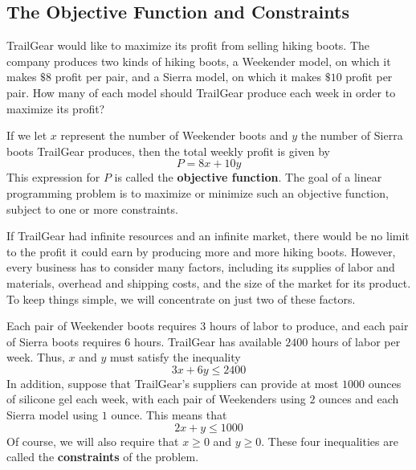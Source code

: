 \documentclass[10pt,]{book}
\newcommand{\terminology}[1]{\textbf{#1}}
\theoremstyle{plain}
\theoremstyle{definition}
\theoremstyle{definition}
\theoremstyle{definition}
\numberwithin{equation}{part}
\begin{document}
\subsection[{The Objective Function and Constraints}]{The Objective Function and Constraints}\label{subsection-1}
TrailGear would like to maximize its profit from selling hiking boots. The company produces two kinds of hiking boots, a Weekender model, on which it makes \(\$8\) profit per pair, and a Sierra model, on which it makes \(\$10\) profit per pair. How many of each model should TrailGear produce each week in order to maximize its profit?%
\par
If we let \(x\) represent the number of Weekender boots and \(y\) the number of Sierra boots TrailGear produces, then the total weekly profit is given by%
\begin{equation*}
P = 8x + 10y
\end{equation*}
This expression for \(P\) is called the \terminology{objective function}. The goal of a linear programming problem is to maximize or minimize such an objective function, subject to one or more constraints.%
\par
If TrailGear had infinite resources and an infinite market, there would be no limit to the profit it could earn by producing more and more hiking boots. However, every business has to consider many factors, including its supplies of labor and materials, overhead and shipping costs, and the size of the market for its product. To keep things simple, we will concentrate on just two of these factors.%
\par
Each pair of Weekender boots requires \(3\) hours of labor to produce, and each pair of Sierra boots requires \(6\) hours. TrailGear has available \(2400\) hours of labor per week. Thus, \(x\) and \(y\) must satisfy the inequality%
\begin{equation*}
3x + 6y \le 2400
\end{equation*}
In addition, suppose that TrailGear's suppliers can provide at most \(1000\) ounces of silicone gel each week, with each pair of Weekenders using \(2\) ounces and each Sierra model using \(1\) ounce. This means that%
\begin{equation*}
2x + y \le 1000
\end{equation*}
Of course, we will also require that \(x\ge 0\) and \(y\ge 0\). These four inequalities are called the \terminology{constraints} of the problem.%
\typeout{************************************************}
\typeout{************************************************}
\end{document}
